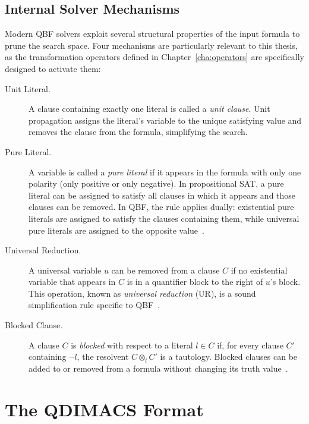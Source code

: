 \subsection{Internal Solver Mechanisms}\label{subsec:mechanisms}

Modern QBF solvers exploit several structural properties of the input formula to prune the search space. Four mechanisms are particularly relevant to this thesis, as the transformation operators defined in Chapter~\ref{cha:operators} are specifically designed to activate them:

\begin{description}
  \item[Unit Literal.] A clause containing exactly one literal is called a \emph{unit clause}. Unit propagation assigns the literal's variable to the unique satisfying value and removes the clause from the formula, simplifying the search.

  \item[Pure Literal.] A variable is called a \emph{pure literal} if it appears in the formula with only one polarity (only positive or only negative). In propositional SAT, a pure literal can be assigned to satisfy all clauses in which it appears and those clauses can be removed. In QBF, the rule applies dually: existential pure literals are assigned to satisfy the clauses containing them, while universal pure literals are assigned to the opposite value~\cite{LonsingBiere2010}.
  
  \item[Universal Reduction.] A universal variable $u$ can be removed from a clause $C$ if no existential variable that appears in $C$ is in a quantifier block to the right of $u$'s block. This operation, known as \emph{universal reduction} (UR), is a sound simplification rule specific to QBF~\cite{KleineBuening1995}.

  \item[Blocked Clause.] A clause $C$ is \emph{blocked} with respect to a literal $l \in C$ if, for every clause $C'$ containing $\lnot l$, the resolvent $C \otimes_{l} C'$ is a tautology. Blocked clauses can be added to or removed from a formula without changing its truth value~\cite{BiereEtAl2011}.
\end{description}

\section{The QDIMACS Format}\label{sec:qdimacs}

